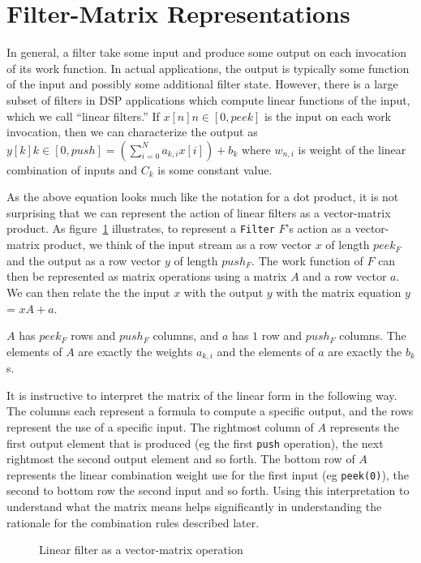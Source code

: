 \section{Filter-Matrix Representations}
In general, a filter take some input and produce some output on
each invocation of its work function. In actual applications, the output
is typically some function of the input and possibly some additional 
filter state. However, there is a large subset of filters in DSP applications
which compute linear functions of the input, which we call ``linear filters.''
If $x[n] n\in[0,peek]$ is the input on each work invocation, then we can 
characterize the output as  $y[k] k\in[0,push] = (\sum_{i=0}^{N} a_{k,i}x[i])+b_{k}$ 
where $w_{n,i}$ is weight of the linear combination of inputs and $C_{k}$ is some
constant value.

As the above equation looks much like the notation for a dot product, 
it is not surprising that we can represent the action of linear filters 
as a vector-matrix product. As figure~\ref{fig:overview-matrix} illustrates, 
to represent a {\tt Filter} $F$'s action as a vector-matrix product, we 
think of the input stream as a row vector $x$ of length $peek_{F}$
and the output as a row vector $y$ of length $push_{F}$. The work function
of $F$ can then be represented as matrix operations using a matrix $A$ and 
a row vector $a$. We can then relate the the input $x$ with the output $y$
with the matrix equation $y$ = $xA + a$. 

$A$ has $peek_{F}$ rows and $push_{F}$ columns, and $a$ has $1$ row 
and $push_{F}$ columns. The elements of $A$ are exactly the weights $a_{k,i}$ 
and the elements of $a$ are exactly the $b_{k}$s.

It is instructive to interpret the matrix of the linear form in the following
way. The columns each represent a formula to compute a specific output, and the 
rows represent the use of a specific input. The rightmost column of $A$ represents
the first output element that is produced (eg the first {\tt push} operation), 
the next rightmost the second output element and so forth. The bottom row 
of $A$ represents the linear combination weight use for the first input 
(eg {\tt peek(0)}), the second to bottom row the second input and so forth.
Using this interpretation to understand what the matrix means helps significantly
in understanding the rationale for the combination rules described later.

\begin{figure}
\center
\epsfxsize=3.0in
\caption{Linear filter as a vector-matrix operation}
\label{fig:overview-matrix}
\end{figure}

